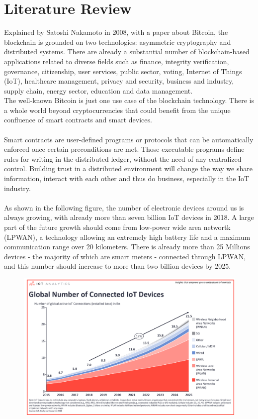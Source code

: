 \documentclass[11pt]{article}
\begin{document}
\section{Literature Review}
Explained by Satoshi Nakamoto in 2008, with a paper about Bitcoin, the blockchain is grounded on two technologies: asymmetric cryptography and distributed systems. There are already a substantial number of blockchain-based applications related to diverse fields such as finance, integrity verification, governance, citizenship, user services, public sector, voting, Internet of Things (IoT), healthcare management, privacy and security, business and industry, supply chain, energy sector, education and data management.\cite{1} \\
The well-known Bitcoin is just one use case of the blockchain technology. There is a whole world beyond cryptocurrencies that could benefit from the unique confluence of smart contracts and smart devices.\\\\
Smart contracts are user-defined programs or protocols that can be automatically enforced once certain preconditions are met. Those executable programs define rules for writing in the distributed ledger, without the need of any centralized control. Building trust in a distributed environment will change the way we share information, interact with each other and thus do business, especially in the IoT industry.\cite{2}\\\\
As shown in the following figure\cite{3}, the number of electronic devices around us is always growing, with already more than seven billion IoT devices in 2018. A large part of the future growth should come from low-power wide area networtk (LPWAN), a technology allowing an extremely high battery life and a maximum communication range over 20 kilometers. There is already more than 25 Millions devices - the majority of which are smart meters - connected through LPWAN, and this number should increase to more than two billion devices by 2025.\\
\begin{figure}[h]
	\centering
	\includegraphics[width=1\linewidth]{stateofIoT2018.png}
\end{figure}\\
\end{document}
